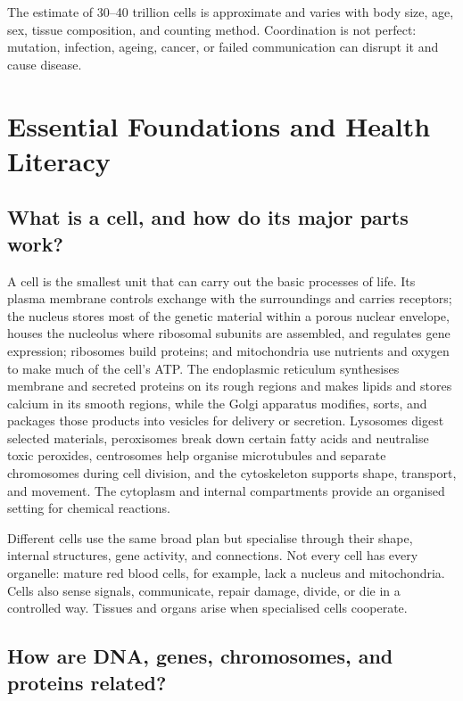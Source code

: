 \documentclass[11pt,oneside]{report}
\begin{document}
The estimate of 30--40 trillion cells is approximate and varies with body size,
age, sex, tissue composition, and counting method. Coordination is not perfect:
mutation, infection, ageing, cancer, or failed communication can disrupt it and
cause disease.

\chapter{Essential Foundations and Health Literacy}

\section{What is a cell, and how do its major parts work?}

A cell is the smallest unit that can carry out the basic processes of life. Its
plasma membrane controls exchange with the surroundings and carries receptors;
the nucleus stores most of the genetic material within a porous nuclear
envelope, houses the nucleolus where ribosomal subunits are assembled, and
regulates gene expression; ribosomes build proteins; and mitochondria use
nutrients and oxygen to make much of the cell's ATP. The endoplasmic reticulum
synthesises membrane and secreted proteins on its rough regions and makes lipids
and stores calcium in its smooth regions, while the Golgi apparatus modifies,
sorts, and packages those products into vesicles for delivery or secretion.
Lysosomes digest selected materials, peroxisomes break down certain fatty acids
and neutralise toxic peroxides, centrosomes help organise microtubules and
separate chromosomes during cell division, and the cytoskeleton supports shape,
transport, and movement. The cytoplasm and internal compartments provide an
organised setting for chemical reactions.

Different cells use the same broad plan but specialise through their shape,
internal structures, gene activity, and connections. Not every cell has every
organelle: mature red blood cells, for example, lack a nucleus and mitochondria.
Cells also sense signals, communicate, repair damage, divide, or die in a
controlled way. Tissues and organs arise when specialised cells cooperate.

\section{How are DNA, genes, chromosomes, and proteins related?}
\end{document}
